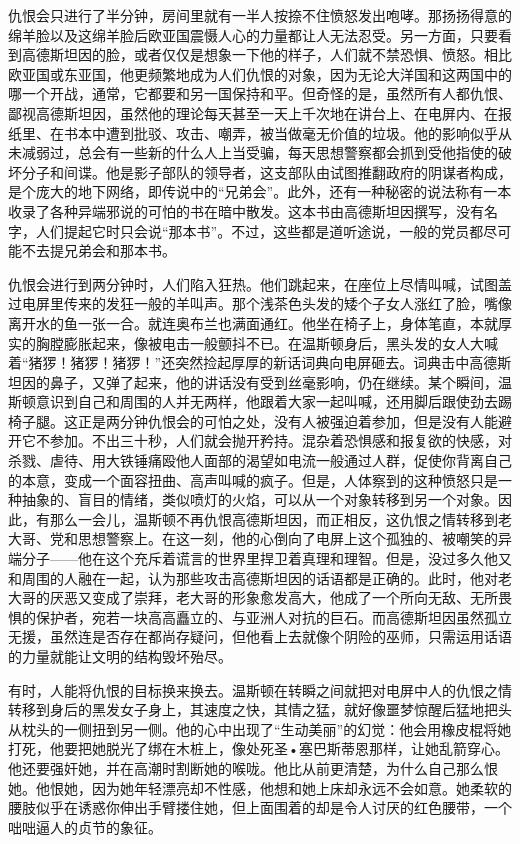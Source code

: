 仇恨会只进行了半分钟，房间里就有一半人按捺不住愤怒发出咆哮。那扬扬得意的绵羊脸以及这绵羊脸后欧亚国震慑人心的力量都让人无法忍受。另一方面，只要看到高德斯坦因的脸，或者仅仅是想象一下他的样子，人们就不禁恐惧、愤怒。相比欧亚国或东亚国，他更频繁地成为人们仇恨的对象，因为无论大洋国和这两国中的哪一个开战，通常，它都要和另一国保持和平。但奇怪的是，虽然所有人都仇恨、鄙视高德斯坦因，虽然他的理论每天甚至一天上千次地在讲台上、在电屏内、在报纸里、在书本中遭到批驳、攻击、嘲弄，被当做毫无价值的垃圾。他的影响似乎从未减弱过，总会有一些新的什么人上当受骗，每天思想警察都会抓到受他指使的破坏分子和间谍。他是影子部队的领导者，这支部队由试图推翻政府的阴谋者构成，是个庞大的地下网络，即传说中的``兄弟会''。此外，还有一种秘密的说法称有一本收录了各种异端邪说的可怕的书在暗中散发。这本书由高德斯坦因撰写，没有名字，人们提起它时只会说``那本书''。不过，这些都是道听途说，一般的党员都尽可能不去提兄弟会和那本书。

仇恨会进行到两分钟时，人们陷入狂热。他们跳起来，在座位上尽情叫喊，试图盖过电屏里传来的发狂一般的羊叫声。那个浅茶色头发的矮个子女人涨红了脸，嘴像离开水的鱼一张一合。就连奥布兰也满面通红。他坐在椅子上，身体笔直，本就厚实的胸膛膨胀起来，像被电击一般颤抖不已。在温斯顿身后，黑头发的女人大喊着``猪猡！猪猡！猪猡！''还突然捡起厚厚的新话词典向电屏砸去。词典击中高德斯坦因的鼻子，又弹了起来，他的讲话没有受到丝毫影响，仍在继续。某个瞬间，温斯顿意识到自己和周围的人并无两样，他跟着大家一起叫喊，还用脚后跟使劲去踢椅子腿。这正是两分钟仇恨会的可怕之处，没有人被强迫着参加，但是没有人能避开它不参加。不出三十秒，人们就会抛开矜持。混杂着恐惧感和报复欲的快感，对杀戮、虐待、用大铁锤痛殴他人面部的渴望如电流一般通过人群，促使你背离自己的本意，变成一个面容扭曲、高声叫喊的疯子。但是，人体察到的这种愤怒只是一种抽象的、盲目的情绪，类似喷灯的火焰，可以从一个对象转移到另一个对象。因此，有那么一会儿，温斯顿不再仇恨高德斯坦因，而正相反，这仇恨之情转移到老大哥、党和思想警察上。在这一刻，他的心倒向了电屏上这个孤独的、被嘲笑的异端分子------他在这个充斥着谎言的世界里捍卫着真理和理智。但是，没过多久他又和周围的人融在一起，认为那些攻击高德斯坦因的话语都是正确的。此时，他对老大哥的厌恶又变成了崇拜，老大哥的形象愈发高大，他成了一个所向无敌、无所畏惧的保护者，宛若一块高高矗立的、与亚洲人对抗的巨石。而高德斯坦因虽然孤立无援，虽然连是否存在都尚存疑问，但他看上去就像个阴险的巫师，只需运用话语的力量就能让文明的结构毁坏殆尽。

有时，人能将仇恨的目标换来换去。温斯顿在转瞬之间就把对电屏中人的仇恨之情转移到身后的黑发女子身上，其速度之快，其情之猛，就好像噩梦惊醒后猛地把头从枕头的一侧扭到另一侧。他的心中出现了``生动美丽''的幻觉：他会用橡皮棍将她打死，他要把她脱光了绑在木桩上，像处死圣•塞巴斯蒂恩那样，让她乱箭穿心。他还要强奸她，并在高潮时割断她的喉咙。他比从前更清楚，为什么自己那么恨她。他恨她，因为她年轻漂亮却不性感，他想和她上床却永远不会如意。她柔软的腰肢似乎在诱惑你伸出手臂搂住她，但上面围着的却是令人讨厌的红色腰带，一个咄咄逼人的贞节的象征。

